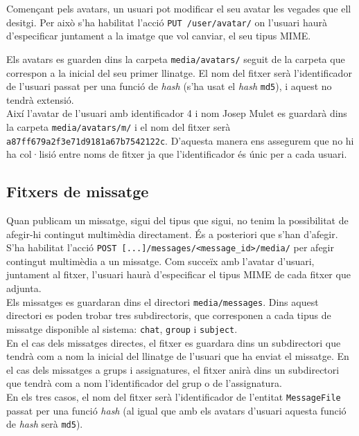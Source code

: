 Començant pels avatars, un usuari pot modificar el seu avatar les vegades que ell desitgi. Per això s'ha habilitat l'acció \texttt{PUT /user/avatar/} on l'usuari haurà d'especificar juntament a la imatge que vol canviar, el seu tipus \ac{MIME}.

Els avatars es guarden dins la carpeta \texttt{media/avatars/} seguit de la carpeta que correspon a la inicial del seu primer llinatge. El nom del fitxer serà l'identificador de l'usuari passat per una funció de \emph{hash} (s'ha usat el \emph{hash} \texttt{md5}), i aquest no tendrà extensió. \\

Així l'avatar de l'usuari amb identificador 4 i nom Josep Mulet es guardarà dins la carpeta \texttt{media/avatars/m/} i el nom del fitxer serà \texttt{a87ff679a2f3e71d9181a67b7542122c}. D'aquesta manera ens assegurem que no hi ha col·lisió entre noms de fitxer ja que l'identificador és únic per a cada usuari.

\subsection{Fitxers de missatge}

Quan publicam un missatge, sigui del tipus que sigui, no tenim la possibilitat de afegir-hi contingut multimèdia directament. És a posteriori que s'han d'afegir. S'ha habilitat l'acció \verb$POST [...]/messages/<message_id>/media/$ per afegir contingut multimèdia a un missatge. Com succeïx amb l'avatar d'usuari, juntament al fitxer, l'usuari haurà d'especificar el tipus \ac{MIME} de cada fitxer que adjunta.\\

Els missatges es guardaran dins el directori \texttt{media/messages}. Dins aquest directori es poden trobar tres subdirectoris, que corresponen a cada tipus de missatge disponible al sistema: \texttt{chat}, \texttt{group} i \texttt{subject}.\\

En el cas dels missatges directes, el fitxer es guardara dins un subdirectori que tendrà com a nom la inicial del llinatge de l'usuari que ha enviat el missatge. En el cas dels missatges a grups i assignatures, el fitxer anirà dins un subdirectori que tendrà com a nom l'identificador del grup o de l'assignatura. \\

En els tres casos, el nom del fitxer serà l'identificador de l'entitat \texttt{MessageFile} passat per una funció \emph{hash} (al igual que amb els avatars d'usuari aquesta funció de \emph{hash} serà \texttt{md5}).\\

